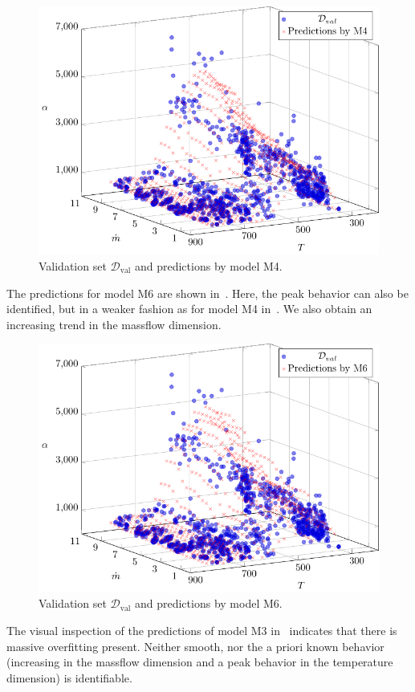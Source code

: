 \begin{figure}[H]
	\centering
	\includegraphics[width=\columnwidth]{graphics/pgfplots/cha5/M4.pdf}
	\caption{Validation set $\mathcal{D}_{\text{val}}$ and predictions by model M4.}
	\label{fig:ebner-M4}
\end{figure}

The predictions for model M6 are shown in~. Here, the peak behavior can also be identified, but in a weaker fashion as for model M4 in~. We also obtain an increasing trend in the massflow dimension. 

\begin{figure}[H]
	\centering
	\includegraphics[width=\columnwidth]{graphics/pgfplots/cha5/M6.pdf}
	\caption{Validation set $\mathcal{D}_{\text{val}}$ and predictions by model M6.}
	\label{fig:ebner-M6}
\end{figure}
%
The visual inspection of the predictions of model M3 in~ indicates that there is massive overfitting present. Neither smooth, nor the a priori known behavior (increasing in the massflow dimension and a peak behavior in the temperature dimension) is identifiable.  

